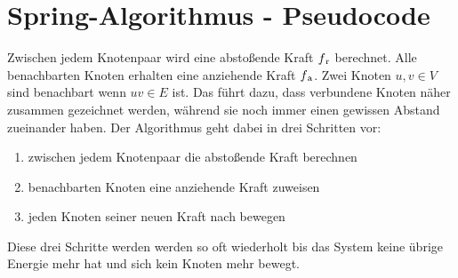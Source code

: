 \section{Spring-Algorithmus - Pseudocode}
\label{Kapitel_2_-_Unterkapitel_2}
%

Zwischen jedem Knotenpaar wird eine abstoßende Kraft \begin{math} f\textsubscript r \end{math} berechnet. Alle
benachbarten Knoten erhalten eine anziehende Kraft \begin{math} f\textsubscript a \end{math}. Zwei Knoten \begin{math} u,v \in V \end{math}sind benachbart wenn \begin{math} uv \in E \end{math} ist. Das führt dazu, dass verbundene Knoten näher zusammen
gezeichnet werden, während sie noch immer einen gewissen Abstand zueinander
haben. Der Algorithmus geht dabei in drei Schritten vor:

\begin{enumerate}
	\item zwischen jedem Knotenpaar die abstoßende Kraft berechnen
	\item benachbarten Knoten eine anziehende Kraft zuweisen
	\item jeden Knoten seiner neuen Kraft nach bewegen
\end{enumerate} 
Diese drei Schritte werden werden so oft wiederholt bis das System keine
übrige Energie mehr hat und sich kein Knoten mehr bewegt.

